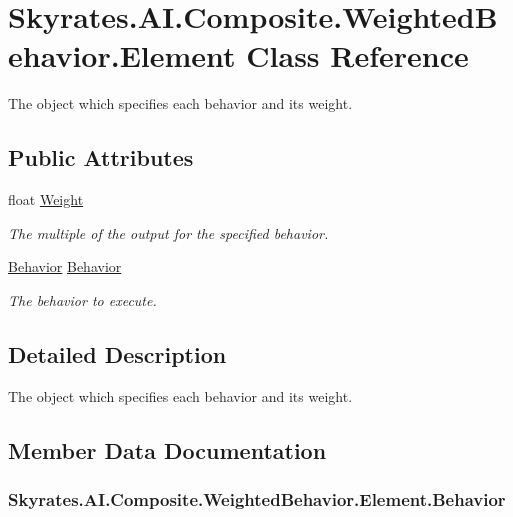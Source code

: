\hypertarget{class_skyrates_1_1_a_i_1_1_composite_1_1_weighted_behavior_1_1_element}{\section{Skyrates.\-A\-I.\-Composite.\-Weighted\-Behavior.\-Element Class Reference}
\label{class_skyrates_1_1_a_i_1_1_composite_1_1_weighted_behavior_1_1_element}
}


The object which specifies each behavior and its weight.  


\subsection*{Public Attributes}
\begin{DoxyCompactItemize}
\item 
float \hyperlink{class_skyrates_1_1_a_i_1_1_composite_1_1_weighted_behavior_1_1_element_a7c8737da0c01c16ed847fdd1f1f2c961}{Weight}
\begin{DoxyCompactList}\small\item\em The multiple of the output for the specified behavior. \end{DoxyCompactList}\item 
\hyperlink{class_skyrates_1_1_a_i_1_1_behavior}{Behavior} \hyperlink{class_skyrates_1_1_a_i_1_1_composite_1_1_weighted_behavior_1_1_element_aac52f846eaad0d9839fa4c88650fcc21}{Behavior}
\begin{DoxyCompactList}\small\item\em The behavior to execute. \end{DoxyCompactList}\end{DoxyCompactItemize}


\subsection{Detailed Description}
The object which specifies each behavior and its weight. 



\subsection{Member Data Documentation}
\hypertarget{class_skyrates_1_1_a_i_1_1_composite_1_1_weighted_behavior_1_1_element_aac52f846eaad0d9839fa4c88650fcc21}{
\subsubsection[{Behavior}]{ Skyrates.\-A\-I.\-Composite.\-Weighted\-Behavior.\-Element.\-Behavior}}\label{class_skyrates_1_1_a_i_1_1_composite_1_1_weighted_behavior_1_1_element_aac52f846eaad0d9839fa4c88650fcc21}


